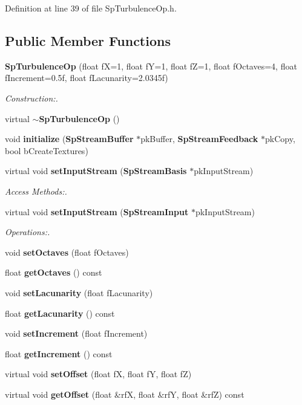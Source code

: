 Definition at line 39 of file Sp\-Turbulence\-Op.h.\subsection*{Public Member Functions}
\begin{CompactItemize}
\item 
{\bf Sp\-Turbulence\-Op} (float f\-X=1, float f\-Y=1, float f\-Z=1, float f\-Octaves=4, float f\-Increment=0.5f, float f\-Lacunarity=2.0345f)
\begin{CompactList}\small\item\em Construction:. \item\end{CompactList}\item 
virtual {\bf $\sim$Sp\-Turbulence\-Op} ()
\item 
void {\bf initialize} ({\bf Sp\-Stream\-Buffer} $\ast$pk\-Buffer, {\bf Sp\-Stream\-Feedback} $\ast$pk\-Copy, bool b\-Create\-Textures)
\item 
virtual void {\bf set\-Input\-Stream} ({\bf Sp\-Stream\-Basis} $\ast$pk\-Input\-Stream)
\begin{CompactList}\small\item\em Access Methods:. \item\end{CompactList}\item 
virtual void {\bf set\-Input\-Stream} ({\bf Sp\-Stream\-Input} $\ast$pk\-Input\-Stream)
\begin{CompactList}\small\item\em Operations:. \item\end{CompactList}\item 
void {\bf set\-Octaves} (float f\-Octaves)
\item 
float {\bf get\-Octaves} () const
\item 
void {\bf set\-Lacunarity} (float f\-Lacunarity)
\item 
float {\bf get\-Lacunarity} () const
\item 
void {\bf set\-Increment} (float f\-Increment)
\item 
float {\bf get\-Increment} () const
\item 
virtual void {\bf set\-Offset} (float f\-X, float f\-Y, float f\-Z)
\item 
virtual void {\bf get\-Offset} (float \&rf\-X, float \&rf\-Y, float \&rf\-Z) const
\end{CompactItemize}
